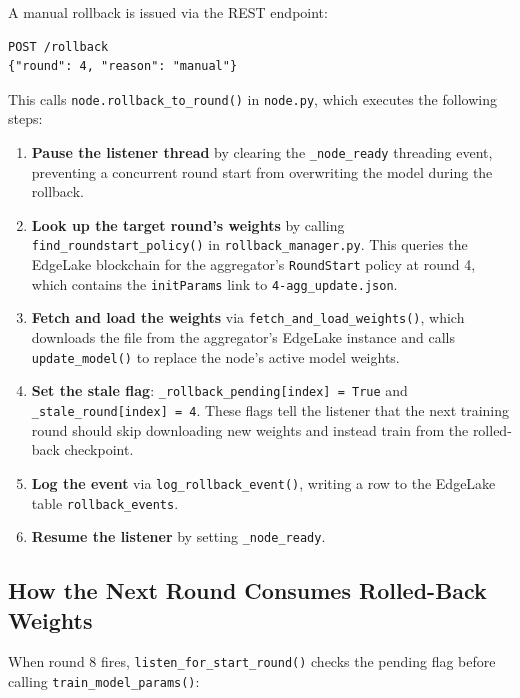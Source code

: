 \documentclass[11pt]{article}
\begin{document}
A manual rollback is issued via the REST endpoint:

\begin{lstlisting}[style=logstyle]
POST /rollback
{"round": 4, "reason": "manual"}
\end{lstlisting}

This calls \texttt{node.rollback\_to\_round()} in \texttt{node.py}, which executes the following steps:

\begin{enumerate}
    \item \textbf{Pause the listener thread} by clearing the \texttt{\_node\_ready} threading event, preventing a concurrent round start from overwriting the model during the rollback.

    \item \textbf{Look up the target round's weights} by calling \texttt{find\_roundstart\_policy()} in \texttt{rollback\_manager.py}. This queries the EdgeLake blockchain for the aggregator's \texttt{RoundStart} policy at round 4, which contains the \texttt{initParams} link to \texttt{4-agg\_update.json}.

    \item \textbf{Fetch and load the weights} via \texttt{fetch\_and\_load\_weights()}, which downloads the file from the aggregator's EdgeLake instance and calls \texttt{update\_model()} to replace the node's active model weights.

    \item \textbf{Set the stale flag}: \texttt{\_rollback\_pending[index] = True} and \texttt{\_stale\_round[index] = 4}. These flags tell the listener that the next training round should skip downloading new weights and instead train from the rolled-back checkpoint.

    \item \textbf{Log the event} via \texttt{log\_rollback\_event()}, writing a row to the EdgeLake table \texttt{rollback\_events}.

    \item \textbf{Resume the listener} by setting \texttt{\_node\_ready}.
\end{enumerate}

\subsection{How the Next Round Consumes Rolled-Back Weights}

When round 8 fires, \texttt{listen\_for\_start\_round()} checks the pending flag before calling \texttt{train\_model\_params()}:
\end{document}
